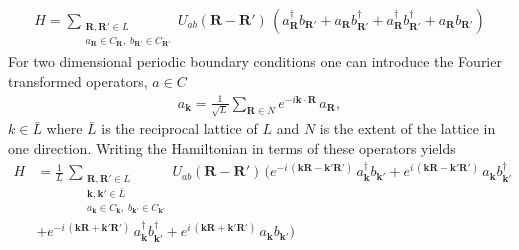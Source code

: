 \begin{align*}
    H = \sum_{\substack{\mathbf{R},\mathbf{R}'\in L\\a_\mathbf{R}\in C_\mathbf{R},\;b_{\mathbf{R}'}\in C_{\mathbf{R}'}}}U_{ab}(\mathbf{R}-\mathbf{R}')\,\left( a_{\mathbf{R}}^{\dagger} b_{\mathbf{R}'}+a_{\mathbf{R}} b_{\mathbf{R}'}^{\dagger} + a_{\mathbf{R}}^{\dagger} b_{\mathbf{R}'}^{\dagger}+a_{\mathbf{R}} b_{\mathbf{R}'}\right)
\end{align*}
For two dimensional periodic boundary conditions one can introduce the Fourier transformed operators, $a\in C$
\begin{align*}
    a_{\mathbf{k}} = \frac{1}{\sqrt{L}}\sum_{\mathbf{R}\in N} e^{-i\mathbf{k}\cdot\mathbf{R}}\,a_{\mathbf{R}},
\end{align*}
$k\in \bar{L}$ where $\bar{L}$ is the reciprocal lattice of $L$ and $N$ is the extent of the lattice in one direction.
Writing the Hamiltonian in terms of these operators yields
\begin{align*}
    H &=\frac{1}{L}\,  \sum_{\substack{\mathbf{R},\mathbf{R}'\in L\\\mathbf{k},\mathbf{k}'\in\bar{L}\\a_\mathbf{k}\in C_\mathbf{k},\;b_{\mathbf{k}'}\in C_{\mathbf{k}'}}}U_{ab}(\mathbf{R}-\mathbf{R}')\,\Bigg(e^{-i\,(\mathbf{k}\mathbf{R}-\mathbf{k}'\mathbf{R}')}\, a_{\mathbf{k}}^{\dagger} b_{\mathbf{k}'}+ e^{i\,(\mathbf{k}\mathbf{R}-\mathbf{k}'\mathbf{R}')}\, a_{\mathbf{k}} b_{\mathbf{k}'}^{\dagger} \\&+  e^{-i\,(\mathbf{k}\mathbf{R}+\mathbf{k}'\mathbf{R}')}\,a_{\mathbf{k}}^{\dagger} b_{\mathbf{k}'}^{\dagger}+  e^{i\,(\mathbf{k}\mathbf{R}+\mathbf{k}'\mathbf{R}')}\,a_{\mathbf{k}} b_{\mathbf{k}'}\Bigg)\\\\
\end{align*}
